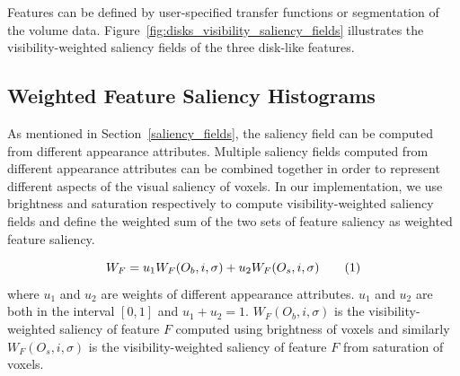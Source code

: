 Features can be defined by user-specified transfer functions or segmentation of the volume data.
Figure~\ref{fig:disks_visibility_saliency_fields} illustrates the visibility-weighted saliency fields of the three disk-like features.

\subsection{Weighted Feature Saliency Histograms \label{weighted_feature_saliency}}
As mentioned in Section~\ref{saliency_fields}, the saliency field can be computed from different appearance attributes.
Multiple saliency fields computed from different appearance attributes can be combined together in order to represent different aspects of the visual saliency of voxels.
In our implementation, we use brightness and saturation respectively to compute visibility-weighted saliency fields and define the weighted sum of the two sets of feature saliency as weighted feature saliency.


\[ W_{F}=u_{1}W_{F}(O_{b},i,\sigma)+u_{2}W_{F}(O_{s},i,\sigma)
\addtag \]
where $ u_{1}$ and $ u_{2}$ are weights of different appearance attributes. $ u_{1}$ and $ u_{2}$ are both in the interval $[0,1] $ and $ u_{1}+u_{2}=1 $. $ W_{F}(O_{b},i,\sigma) $ is the visibility-weighted saliency of feature $ F $ computed using brightness of voxels and similarly $ W_{F}(O_{s},i,\sigma) $ is the visibility-weighted saliency of feature $ F $ from saturation of voxels.

